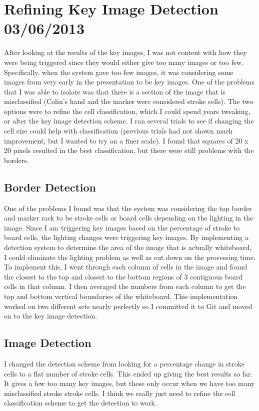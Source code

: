 \documentclass[]{article}
\begin{document}
	\tableofcontents
	\newpage
	\setcounter{page}{1}
	\thispagestyle{empty}
	
	
	\setlength{\parindent}{0pt}
	\setlength{\parskip}{6pt}
	
	\section{Refining Key Image Detection 03/06/2013}
		After looking at the results of the key images, I was not content with how they were being triggered since they would either give too many images or too few. Specifically, when the system gave too few images, it was considering some images from very early in the presentation to be key images. One of the problems that I was able to isolate was that there is a section of the image that is misclassified (Colin's hand and the marker were considered stroke cells). The two options were to refine the cell classification, which I could spend years tweaking, or alter the key image detection scheme. I ran several trials to see if changing the cell size could help with classification (previous trials had not shown much improvement, but I wanted to try on a finer scale). I found that squares of 20 x 20 pixels resulted in the best classification, but there were still problems with the borders. 
		
		\subsection{Border Detection}
			One of the problems I found was that the system was considering the top border and marker rack to be stroke cells or board cells depending on the lighting in the image. Since I am triggering key images based on the percentage of stroke to board cells, the lighting changes were triggering key images. By implementing a detection system to determine the area of the image that is actually whiteboard, I could eliminate the lighting problem as well as cut down on the processing time. To implement this, I went through each column of cells in the image and found the closest to the top and closest to the bottom regions of 3 contiguous board cells in that column. I then averaged the numbers from each column to get the top and bottom vertical boundaries of the whiteboard. This implementation worked on two different sets nearly perfectly so I committed it to Git and moved on to the key image detection.
			
		\subsection{Image Detection}
			I changed the detection scheme from looking for a percentage change in stroke cells to a flat number of stroke cells. This ended up giving the best results so far. It gives a few too many key images, but these only occur when we have too many misclassified stroke stroke cells. I think we really just need to refine the cell classification scheme to get the detection to work. 
			
\end{document}
